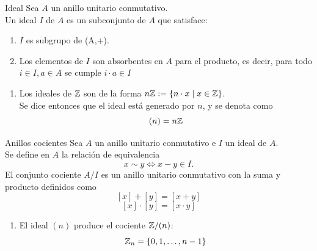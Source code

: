 \documentclass[10pt,t]{beamer}
\begin{document}
\begin{frame}
    \begin{block}{\centering \large Ideal}
        Sea $A$ un anillo unitario conmutativo.\\
        Un ideal $I$ de $A$ es un subconjunto de $A$ que satisface:
    \begin{enumerate}[label=\roman*)]
        \item $I$ es subgrupo de (A,+).
        \item Los elementos de $I$ son absorbentes en $A$ para el producto, es decir, para todo $i \in I, a\in A$ se cumple $i\cdot a \in I$
    \end{enumerate}
    \end{block}

    \begin{plainexample}
        \begin{enumerate}[label=--]
            \item Los ideales de $\mathbb{Z}$ son de la forma $n\mathbb{Z}:= \{ n \cdot x\mid x\in\mathbb{Z}\}$.\\[1ex]
                Se dice entonces que el ideal está generado por $n$, y se denota como
                \[(n) = n\mathbb{Z}\]
        \end{enumerate}
    \end{plainexample}
\end{frame}

\begin{frame}
    \begin{block}{\centering \large Anillos cocientes}
        Sea $A$ un anillo unitario conmutativo e $I$ un ideal de $A$.\\
        Se define en $A$ la relación de equivalencia 
            \vspace{-0.5em}
            \[x \sim y \iff x -y \in I.\]
        El conjunto cociente $A/I$ es un anillo unitario conmutativo con la suma y producto definidos como
        \[[x] + [y] = [x + y]\]
        \[[x] \cdot [y] = [x \cdot y]\]
    \end{block}

    \begin{plainexample}
        \begin{enumerate}[label=--]
            \setlength{\itemsep}{-0.2em}
            \item El ideal $(n)$ produce el cociente $\mathbb{Z}/(n)$:
                \vspace{-0.5em}
                \[\mathbb{Z}_n = \{0,1, \ldots, n-1\}\]
        \end{enumerate}
    \end{plainexample}
\end{frame}
\end{document}
